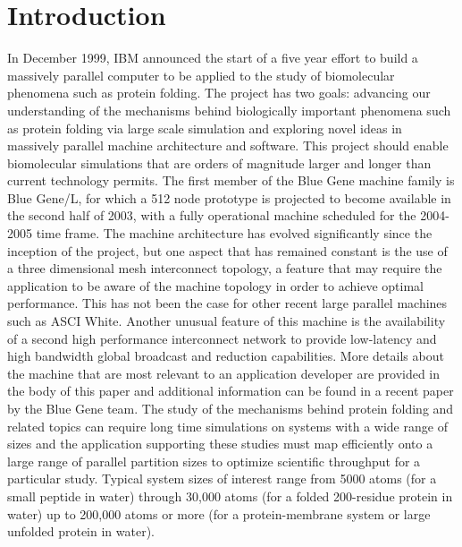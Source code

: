 \documentclass[doublespacing]{elsart}
\begin{document}



\setlength{\headheight}{28pts}

\section{Introduction}

In December 1999, IBM announced the start of a five year effort to
build a massively parallel computer to be applied to the study of
biomolecular phenomena such as protein folding.\cite{allen:2001} The
project has two goals: advancing our understanding of the mechanisms
behind biologically important phenomena such as protein folding via
large scale simulation and exploring novel ideas in massively parallel
machine architecture and software.  This project should enable
biomolecular simulations that are orders of magnitude larger and
longer than current technology permits. The first member of the Blue
Gene machine family is Blue Gene/L, for which a 512 node prototype is
projected to become available in the second half of 2003, with a fully
operational machine scheduled for the 2004-2005 time frame. The
machine architecture has evolved significantly since the inception of
the project, but one aspect that has remained constant is the use of a
three dimensional mesh interconnect topology, a feature that may
require the application to be aware of the machine topology in order
to achieve optimal performance.  This has not been the case for other
recent large parallel machines such as ASCI White.  Another unusual
feature of this machine is the availability of a second high
performance interconnect network to provide low-latency and high
bandwidth global broadcast and reduction capabilities.  More details
about the machine that are most relevant to an application developer
are provided in the body of this paper and additional information can
be found in a recent paper by the Blue Gene team\cite{bgl_sc:2002}.
The study of the mechanisms behind protein folding and related topics
can require long time simulations on systems with a wide range of
sizes and the application supporting these studies must map
efficiently onto a large range of parallel partition sizes to optimize
scientific throughput for a particular study. Typical system sizes of
interest range from 5000 atoms (for a small peptide in water) through
30,000 atoms (for a folded 200-residue protein in water) up to 200,000
atoms or more (for a protein-membrane system or large unfolded protein
in water).
\end{document}
